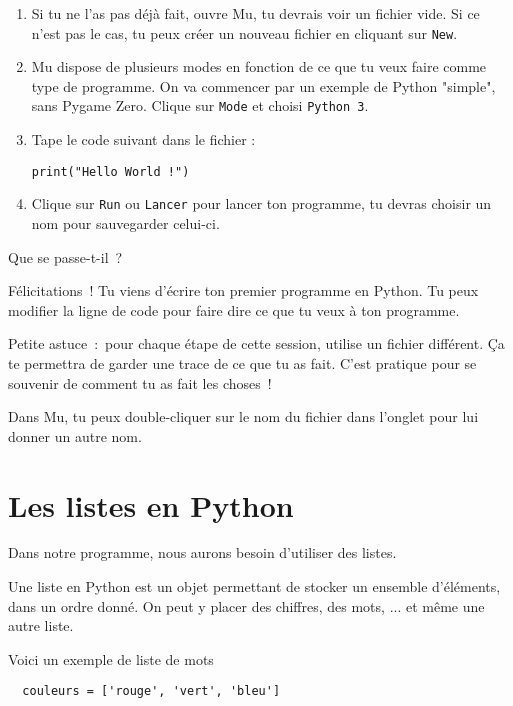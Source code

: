 \documentclass[11pt]{article}
\begin{document}
\begin{enumerate}
    \item Si tu ne l'as pas déjà fait, ouvre Mu, tu devrais voir un fichier vide. Si ce n'est pas le cas, tu peux créer un nouveau fichier en cliquant sur \texttt{New}.
    
    \item Mu dispose de plusieurs modes en fonction de ce que tu veux faire comme type de programme. On va commencer par un exemple de Python "simple", sans Pygame Zero. Clique sur \texttt{Mode} et choisi \texttt{Python 3}.

    \item Tape le code suivant dans le fichier :
\begin{lstlisting}
print("Hello World !")
\end{lstlisting}

    \item Clique sur \texttt{Run} ou \texttt{Lancer} pour lancer ton programme, tu devras choisir un nom pour sauvegarder celui-ci.
\end{enumerate}

Que se passe-t-il~?

Félicitations~! Tu viens d'écrire ton premier programme en Python.
Tu peux modifier la ligne de code pour faire dire ce que tu veux à ton programme.

\begin{framed}
Petite astuce~:~pour chaque étape de cette session, utilise un fichier différent.
Ça te permettra de garder une trace de ce que tu as fait.
C'est pratique pour se souvenir de comment tu as fait les choses~!

Dans Mu, tu peux double-cliquer sur le nom du fichier dans l'onglet pour lui donner un autre nom.
\end{framed}

\section{Les listes en Python}

Dans notre programme, nous aurons besoin d'utiliser des listes.

Une liste en Python est un objet permettant de stocker un ensemble d'éléments, dans un ordre donné. On peut y placer des chiffres, des mots, ... et même une autre liste.

Voici un exemple de liste de mots
\begin{lstlisting}
  couleurs = ['rouge', 'vert', 'bleu']
\end{lstlisting}
\end{document}
